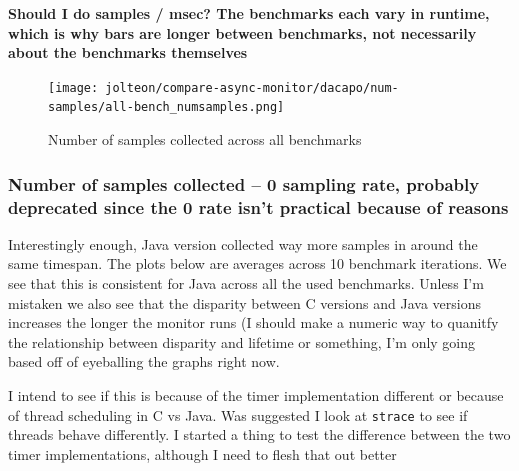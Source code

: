 \documentclass{article}
\begin{document}
\textbf{Should I do samples / msec? The benchmarks each vary in runtime, which is why bars are longer between benchmarks, not necessarily about the benchmarks themselves}
    \begin{figure}[H]
    	\centering
    	\texttt{[image: jolteon/compare-async-monitor/dacapo/num-samples/all-bench\_numsamples.png]}
    	\caption{Number of samples collected across all benchmarks}
    	\label{fig:xalan-fix-PKG}
    \end{figure}

\subsubsection{Number of samples collected -- 0 sampling rate, probably deprecated since the 0 rate isn't practical because of reasons}
Interestingly enough, Java version collected way more samples in around the same timespan. The plots below are averages
across 10 benchmark iterations. We see that this is consistent for Java across all the used benchmarks. Unless I'm mistaken we also see that the disparity between C versions and Java versions increases the longer the monitor runs (I should make a numeric way to quanitfy
the relationship between disparity and lifetime or something, I'm only going based off of eyeballing the graphs right now.

I intend to see if this is because of the timer implementation different or because of thread scheduling in C vs Java. Was suggested I
look at \texttt{strace} to see if threads behave differently. I started a thing to test the difference between the two timer implementations, although I need to flesh that out better
\end{document}
